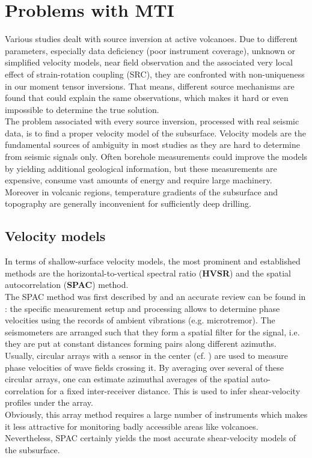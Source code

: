 \documentclass[12pt, a4paper]{article}
\begin{document}
\section*{Problems with MTI}
Various studies dealt with source inversion at active volcanoes. Due to different parameters, especially data deficiency (poor instrument coverage), unknown or simplified velocity models, near field observation and the associated very local effect of strain-rotation coupling (SRC), they are confronted with non-uniqueness in our moment tensor inversions. That means, different source mechanisms are found that could explain the same observations, which makes it hard or even impossible to determine the true solution.\\
The problem associated with every source inversion, processed with real seismic data, is to find a proper velocity model of the subsurface. Velocity models are the fundamental sources of ambiguity in most studies as they are hard to determine from seismic signals only. Often borehole measurements could improve the models by yielding additional geological information, but these measurements are expensive, consume vast amounts of energy and require large machinery. Moreover in volcanic regions, temperature gradients of the subsurface and topography are generally inconvenient for sufficiently deep drilling.
\subsection*{Velocity models}
In terms of shallow-surface velocity models, the most prominent and established methods are the horizontal-to-vertical spectral ratio (\textbf{HVSR}) and the spatial autocorrelation (\textbf{SPAC}) method.\\
The SPAC method was first described by \citet{Aki1957} and an accurate review can be found in \citet{Chavez2005}: the specific measurement setup and processing allows to determine phase velocities using the records of ambient vibrations (e.g. microtremor). The seismometers are arranged such that they form a spatial filter for the signal, i.e. they are put at constant distances forming pairs along different azimuths. Usually, circular arrays with a sensor in the center (cf. \citet{Aki1965}) are used to measure phase velocities of wave fields crossing it. By averaging over several of these circular arrays, one can estimate azimuthal averages of the spatial auto-correlation for a fixed inter-receiver distance. This is used to infer shear-velocity profiles under the array.\\
Obviously, this array method requires a large number of instruments which makes it less attractive for monitoring badly accessible areas like volcanoes. Nevertheless, SPAC certainly yields the most accurate shear-velocity models of the subsurface.\\
\end{document}
